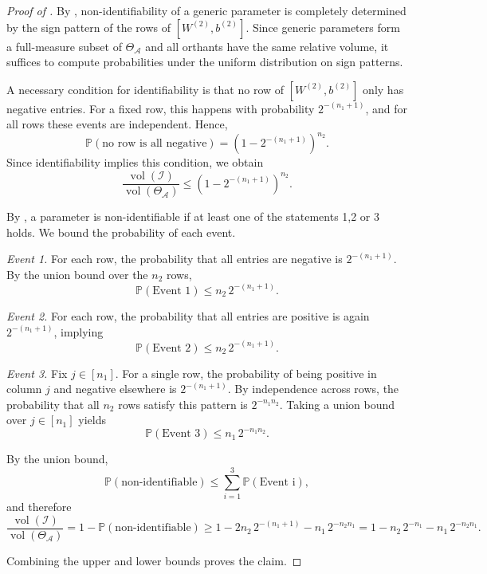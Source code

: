 \documentclass{article}
\theoremstyle{definition}
\newcommand{\architecture}{\mathcal{A}}
\newcommand{\paramspace}[1]{\Theta_{#1}}
\newcommand{\weights}[1]{W^{(#1)}}
\newcommand{\bias}[1]{b^{(#1)}}
\begin{document}
\begin{proof}[Proof of ]
By , non-identifiability of a generic parameter is completely determined by the sign pattern of the rows of $[\weights{2},\bias{2}]$. Since generic parameters form a full-measure subset of $\paramspace{\architecture}$ and all orthants have the same relative volume, 
it suffices to compute probabilities under the uniform distribution on sign patterns.

\medskip

A necessary condition for identifiability is that no row of $[\weights{2},\bias{2}]$ only has negative entries. For a fixed row, this happens with probability $2^{-(n_1+1)}$, and for all rows these events are independent. Hence,
\[
\mathbb{P}(\text{no row is all negative})
= (1 - 2^{-(n_1+1)})^{n_2}.
\]
Since identifiability implies this condition, we obtain
\[
\frac{\operatorname{vol}(\mathcal{I})}{\operatorname{vol}(\paramspace{\architecture})}
\le (1 - 2^{-(n_1+1)})^{n_2}.
\]

\medskip

By , a parameter is non-identifiable if at least one of the statements 1,2 or 3 holds. We bound the probability of each event.


\smallskip

\noindent\emph{Event 1.}
For each row, the probability that all entries are negative is $2^{-(n_1+1)}$. By the union bound over the $n_2$ rows,
\[
\mathbb{P}(\text{Event 1}) \le n_2 \, 2^{-(n_1+1)}.
\]

\smallskip

\noindent\emph{Event 2.}
For each row, the probability that all entries are positive is again $2^{-(n_1+1)}$, implying
\[
\mathbb{P}(\text{Event 2}) \le n_2 \, 2^{-(n_1+1)}.
\]

\smallskip

\noindent\emph{Event 3.}
Fix $j \in [n_1]$. For a single row, the probability of being positive in column $j$ and negative elsewhere is $2^{-(n_1+1)}$.
By independence across rows, the probability that all $n_2$ rows satisfy this pattern is $2^{-n_1 n_2}$. Taking a union bound over $j \in [n_1]$ yields
\[
\mathbb{P}(\text{Event 3}) \le n_1 \, 2^{-n_1 n_2}. 
\]

\medskip

By the union bound, 
\[
\mathbb{P}(\text{non-identifiable})
\le 
\sum_{i=1}^3\mathbb{P}(\text{Event i}) , 
\]
and therefore
\[
\frac{\operatorname{vol}(\mathcal{I})}{\operatorname{vol}(\paramspace{\architecture})}
= 1 - \mathbb{P}(\text{non-identifiable})
\ge
1 - 2n_2 \, 2^{-(n_1+1)}  - n_1 \, 2^{-n_2n_1} = 1 - n_2 \, 2^{-n_1}  - n_1 \, 2^{-n_2n_1}.
\]

\medskip

Combining the upper and lower bounds proves the claim.
\end{proof}
\end{document}

